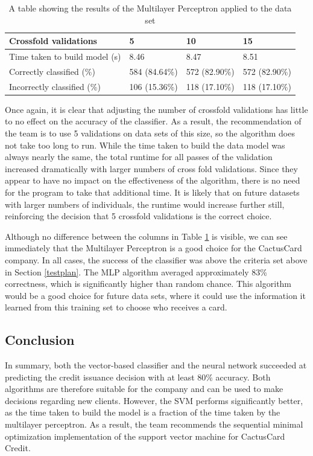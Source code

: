 \documentclass[11pt,journal]{IEEEtran}
\begin{document}
\begin{table}[H]
{\renewcommand{\arraystretch}{1.2}%
	\begin{tabular}{ | p{2.5cm} | l | l | l | }
\hline
Crossfold validations         & 5             & 10            & 15            \\ \hline
Time taken to build model (s) & 8.46          & 8.47          & 8.51          \\ \hline
Correctly classified (\%)     & 584 (84.64\%) & 572 (82.90\%) & 572 (82.90\%) \\ \hline
Incorrectly classified (\%)   & 106 (15.36\%) & 118 (17.10\%) &           118 (17.10\%)  \\ \hline
\end{tabular}
} \quad
\caption{A table showing the results of the Multilayer Perceptron applied to the data set}
\label{fig:mlp}
\end{table}

Once again, it is clear that adjusting the number of crossfold validations has little to no effect on the accuracy of the classifier. As a result, the recommendation of the team is to use 5 validations on data sets of this size, so the algorithm does not take too long to run. While the time taken to build the data model was always nearly the same, the total runtime for all passes of the validation increased dramatically with larger numbers of cross fold validations. Since they appear to have no impact on the effectiveness of the algorithm, there is no need for the program to take that additional time. It is likely that on future datasets with larger numbers of individuals, the runtime would increase further still, reinforcing the decision that 5 crossfold validations is the correct choice.
\par
Although no difference between the columns in Table \ref{fig:mlp} is visible, we can see immediately that the Multilayer Perceptron is a good choice for the CactusCard company. In all cases, the success of the classifier was above the criteria set above in Section \ref{testplan}. The MLP algorithm averaged approximately 83\% correctness, which is significantly higher than random chance. This algorithm would be a good choice for future data sets, where it could use the information it learned from this training set to choose who receives a card.

\subsection{Conclusion}
In summary, both the vector-based classifier and the neural network succeeded at predicting the credit issuance decision with at least 80\% accuracy. Both algorithms are therefore suitable for the company and can be used to make decisions regarding new clients. However, the SVM performs significantly better, as the time taken to build the model is a fraction of the time taken by the multilayer perceptron. As a result, the team recommends the sequential minimal optimization implementation of the support vector machine for CactusCard Credit.
\end{document}
